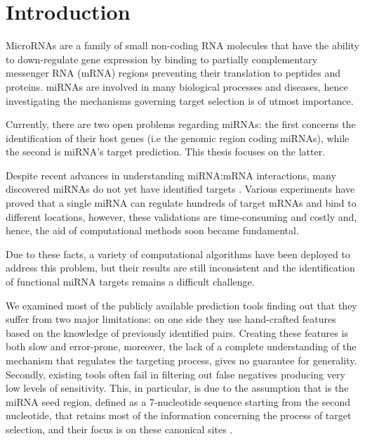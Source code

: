 
\chapter{Introduction} %

\label{Intro} %


\newcommand{\keyword}[1]{\textbf{#1}}
\newcommand{\tabhead}[1]{\textbf{#1}}
\newcommand{\code}[1]{\texttt{#1}}
\newcommand{\file}[1]{\texttt{\bfseries#1}}
\newcommand{\option}[1]{\texttt{\itshape#1}}

MicroRNAs are a family of small non-coding RNA molecules that have the ability to  down-regulate gene expression by binding to partially complementary messenger RNA (mRNA) regions preventing their translation to peptides and proteins. miRNAs are involved in many biological processes and diseases, hence investigating the mechanisms governing target selection is of utmost importance. 

Currently, there are two open problems regarding miRNAs: the first concerns the identification of their host genes (i.e the genomic region coding miRNAs), while the second is miRNA's target prediction. This thesis focuses on the latter.

Despite recent advances in understanding miRNA:mRNA interactions, many discovered miRNAs do not yet have identified targets \cite{perfect_matching}. Various experiments have proved that a single miRNA can regulate hundreds of target mRNAs and bind to different locations, however, these validations are time-consuming and costly and, hence, the aid of computational methods soon became fundamental.

Due to these facts, a variety of computational algorithms have been deployed to address this problem, but their results are still inconsistent and the identification of functional miRNA targets remains a difficult challenge.

We examined most of the publicly available prediction tools finding out that they suffer from two major limitations: on one side they use hand-crafted features based on the knowledge of previously identified pairs. Creating these features is both slow and error-prone, moreover, the lack of a complete understanding of the mechanism that regulates the targeting process, gives no guarantee for generality. Secondly, existing tools often fail in filtering out false negatives producing very low levels of sensitivity. This, in particular, is due to the assumption that is the miRNA seed region, defined as a 7-nucleotide sequence starting from the second nucleotide, that retains most of the information concerning the process of target selection, and their focus is on these canonical sites \cite{canonical_target}.    

